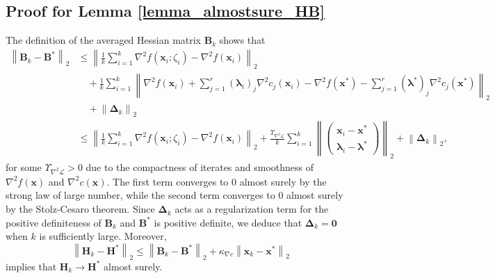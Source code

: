 \documentclass[aos]{imsart}
\numberwithin{equation}{section}
\theoremstyle{plain}
\begin{document}
\begin{appendix}
    \subsection{Proof for Lemma \ref{lemma_almostsure_HB}}
    The definition of the averaged Hessian matrix $\bm{B}_k$ shows that
    \begin{equation}
        \begin{split}
            \left\| \bm{B}_k - \bm{B}^{*} \right\|_2 
            & \leq  \left\| \frac{1}{k} \sum_{i=1}^{k} \nabla^2 f(\bm{x}_i; \zeta_{i}) - \nabla^2 f(\bm{x}_i) \right\|_2 \\
            & \hspace{1em} + \frac{1}{k} \sum_{i=1}^{k} \left\|  \nabla^2 f(\bm{x}_i) + \sum_{j=1}^{r} \left( \bm{\lambda}_{i}\right)_{j}\nabla^2 c_j(\bm{x}_{i}) -  \nabla^2 f(\bm{x}^{*}) - \sum_{j=1}^{r} \left( \bm{\lambda}^{*}\right)_{j}\nabla^2 c_j(\bm{x}^{*}) \right\|_2 \\
            & \hspace{1em} + \left\|\bm{\Delta}_k \right\|_2 \\
            & \leq \left\| \frac{1}{k} \sum_{i=1}^{k} \nabla^2 f(\bm{x}_i; \zeta_{i}) - \nabla^2 f(\bm{x}_i) \right\|_2 + \frac{\Upsilon_{\nabla^2 \mathcal{L}}}{k} \sum_{i=1}^{k} \left\| \left( \begin{array}{c}
                \bm{x}_{i} - \bm{x}^{*} \\
                \bm{\lambda}_{i} - \bm{\lambda}^{*}
            \end{array} \right) \right\|_2 + \left\| \bm{\Delta}_{k} \right\|_2,
        \end{split}
    \end{equation}
    for some $\Upsilon_{\nabla^2 \mathcal{L}}>0$ due to the compactness of iterates and smoothness of $\nabla^2 f (\bm{x})$ and $\nabla^2 c (\bm{x})$.
    The first term converges to $0$ almost surely by the strong law of large number, while the second term converges to $0$ almost surely by the Stolz-Cesaro theorem. Since $\bm{\Delta}_{k}$ acts as a regularization term for the positive definiteness of $\bm{B}_k$ and $\bm{B}^{*}$ is positive definite, we deduce that $\bm{\Delta}_{k} = \bm{0}$ when $k$ is sufficiently large. Moreover, 
    \begin{equation*}
        \left\| \bm{H}_k - \bm{H}^{*} \right\|_2 \leq \left\| \bm{B}_k - \bm{B}^{*} \right\|_2 + \kappa_{\nabla c} \left\| \bm{x}_{k} - \bm{x}^{*} \right\|_2
    \end{equation*}
    implies that  $\bm{H}_k \to \bm{H}^{*} $ almost surely.
   


\end{appendix}
\end{document}
